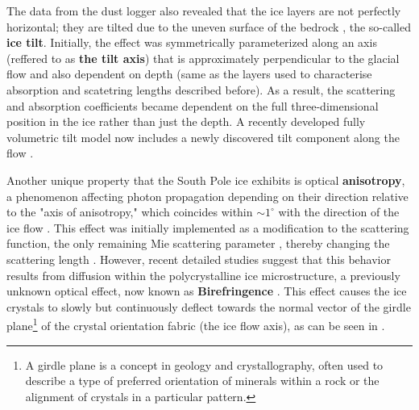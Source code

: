 The data from the dust logger also revealed that the ice layers are not perfectly horizontal; they are tilted due to the uneven surface of the bedrock \cite{dust_logger}, the so-called \textbf{ice tilt}. Initially, the effect was symmetrically parameterized along an axis (reffered to as \textbf{the tilt axis}) that is approximately perpendicular to the glacial flow and also dependent on depth (same as the layers used to characterise absorption and scatetring lengths described before)\cite{spicemie}. As a result, the scattering and absorption coefficients became dependent on the full three-dimensional position in the ice rather than just the depth. A recently developed fully volumetric tilt model now includes a newly discovered tilt component along the flow .


Another unique property that the South Pole ice exhibits is optical \textbf{anisotropy}, a phenomenon affecting photon propagation depending on their direction relative to the "axis of anisotropy," which coincides within $\sim 1^\circ$ with the direction of the ice flow \cite{spicemie}. This effect was initially implemented as a modification to the scattering function, the only remaining Mie scattering parameter , thereby changing the scattering length .  However, recent detailed studies suggest that this behavior results from diffusion within the polycrystalline ice microstructure, a previously unknown optical effect, now known as \textbf{Birefringence} . This effect causes the ice crystals to slowly but continuously deflect towards the normal vector of the girdle plane\footnote{A girdle plane is a concept in geology and crystallography, often used to describe a type of preferred orientation of minerals within a rock or the alignment of crystals in a particular pattern.} of the crystal orientation fabric (the ice flow axis), as can be seen in .


